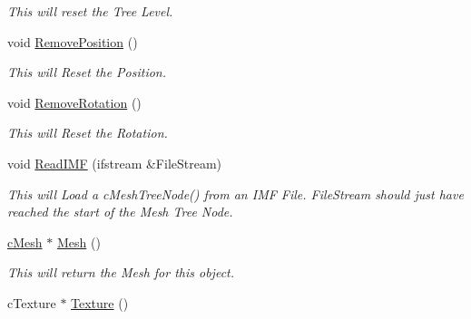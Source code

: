 \begin{DoxyCompactItemize}
\begin{DoxyCompactList}\small\item\em This will reset the Tree Level. \end{DoxyCompactList}\item 
\hypertarget{classc_mesh_tree_node_ad9659fb0be5e1300bcda2265d651dd97}{
void \hyperlink{classc_mesh_tree_node_ad9659fb0be5e1300bcda2265d651dd97}{RemovePosition} ()}
\label{classc_mesh_tree_node_ad9659fb0be5e1300bcda2265d651dd97}

\begin{DoxyCompactList}\small\item\em This will Reset the Position. \end{DoxyCompactList}\item 
\hypertarget{classc_mesh_tree_node_a9ea8fa642a22c047b2e6d559976b615b}{
void \hyperlink{classc_mesh_tree_node_a9ea8fa642a22c047b2e6d559976b615b}{RemoveRotation} ()}
\label{classc_mesh_tree_node_a9ea8fa642a22c047b2e6d559976b615b}

\begin{DoxyCompactList}\small\item\em This will Reset the Rotation. \end{DoxyCompactList}\item 
\hypertarget{classc_mesh_tree_node_a1ca09fa05700321ca076d327fa99220b}{
void \hyperlink{classc_mesh_tree_node_a1ca09fa05700321ca076d327fa99220b}{ReadIMF} (ifstream \&FileStream)}
\label{classc_mesh_tree_node_a1ca09fa05700321ca076d327fa99220b}

\begin{DoxyCompactList}\small\item\em This will Load a cMeshTreeNode() from an IMF File. FileStream should just have reached the start of the Mesh Tree Node. \end{DoxyCompactList}\item 
\hypertarget{classc_mesh_tree_node_ae6da4f910c12301dc657dea2f093c27f}{
\hyperlink{classc_mesh}{cMesh} $\ast$ \hyperlink{classc_mesh_tree_node_ae6da4f910c12301dc657dea2f093c27f}{Mesh} ()}
\label{classc_mesh_tree_node_ae6da4f910c12301dc657dea2f093c27f}

\begin{DoxyCompactList}\small\item\em This will return the Mesh for this object. \end{DoxyCompactList}\item 
\hypertarget{classc_mesh_tree_node_ae680c7ded6800ef8b1b6f473b8ed89e0}{
cTexture $\ast$ \hyperlink{classc_mesh_tree_node_ae680c7ded6800ef8b1b6f473b8ed89e0}{Texture} ()}
\label{classc_mesh_tree_node_ae680c7ded6800ef8b1b6f473b8ed89e0}


\end{DoxyCompactItemize}

